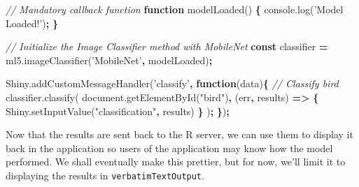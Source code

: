 \documentclass[10pt,]{krantz}
\makeatletter
\newenvironment{Shaded}{\begin{snugshade}}{\end{snugshade}}
\newcommand{\AttributeTok}[1]{\textcolor[rgb]{0.61,0.61,0.61}{#1}}
\newcommand{\CommentTok}[1]{\textcolor[rgb]{0.37,0.37,0.37}{\textit{#1}}}
\newcommand{\KeywordTok}[1]{\textcolor[rgb]{0.27,0.27,0.27}{\textbf{#1}}}
\newcommand{\NormalTok}[1]{#1}
\newcommand{\OperatorTok}[1]{\textcolor[rgb]{0.43,0.43,0.43}{\textbf{#1}}}
\newcommand{\StringTok}[1]{\textcolor[rgb]{0.5,0.5,0.5}{#1}}
\newcommand{\VariableTok}[1]{\textcolor[rgb]{0,0,0}{#1}}
\newenvironment{kframe}{%
\medskip{}
\setlength{\fboxsep}{.8em}
 \def\at@end@of@kframe{}%
 \ifinner\ifhmode%
  \def\at@end@of@kframe{\end{minipage}}%
  \begin{minipage}{\columnwidth}%
 \fi\fi%
 \def\FrameCommand##1{\hskip\@totalleftmargin \hskip-\fboxsep
 \colorbox{shadecolor}{##1}\hskip-\fboxsep
     \hskip-\linewidth \hskip-\@totalleftmargin \hskip\columnwidth}%
 \MakeFramed {\advance\hsize-\width
   \@totalleftmargin\z@ \linewidth\hsize
   \@setminipage}}%
 {\par\unskip\endMakeFramed%
 \at@end@of@kframe}
\renewenvironment{Shaded}{\begin{kframe}}{\end{kframe}}
\makeatother
\begin{document}
\begin{Shaded}
\begin{Highlighting}[]
\CommentTok{// Mandatory callback function}
\KeywordTok{function} \AttributeTok{modelLoaded}\NormalTok{() }\OperatorTok{\{}
  \VariableTok{console}\NormalTok{.}\AttributeTok{log}\NormalTok{(}\StringTok{'Model Loaded!'}\NormalTok{)}\OperatorTok{;}
\OperatorTok{\}}

\CommentTok{// Initialize the Image Classifier method with MobileNet}
\KeywordTok{const}\NormalTok{ classifier }\OperatorTok{=} \VariableTok{ml5}\NormalTok{.}\AttributeTok{imageClassifier}\NormalTok{(}\StringTok{'MobileNet'}\OperatorTok{,}\NormalTok{ modelLoaded)}\OperatorTok{;}

\VariableTok{Shiny}\NormalTok{.}\AttributeTok{addCustomMessageHandler}\NormalTok{(}\StringTok{'classify'}\OperatorTok{,} \KeywordTok{function}\NormalTok{(data)}\OperatorTok{\{}
  \CommentTok{// Classify bird}
  \VariableTok{classifier}\NormalTok{.}\AttributeTok{classify}\NormalTok{(}
    \VariableTok{document}\NormalTok{.}\AttributeTok{getElementById}\NormalTok{(}\StringTok{"bird"}\NormalTok{)}\OperatorTok{,}\NormalTok{ (err}\OperatorTok{,}\NormalTok{ results) }\KeywordTok{=>} \OperatorTok{\{}
      \VariableTok{Shiny}\NormalTok{.}\AttributeTok{setInputValue}\NormalTok{(}\StringTok{"classification"}\OperatorTok{,}\NormalTok{ results)}
    \OperatorTok{\}}
\NormalTok{  )}\OperatorTok{;}
\OperatorTok{\}}\NormalTok{)}\OperatorTok{;}
\end{Highlighting}
\end{Shaded}

Now that the results are sent back to the R server, we can use them to display it back in the application so users of the application may know how the model performed. We shall eventually make this prettier, but for now, we'll limit it to displaying the results in \texttt{verbatimTextOutput}.
\end{document}
